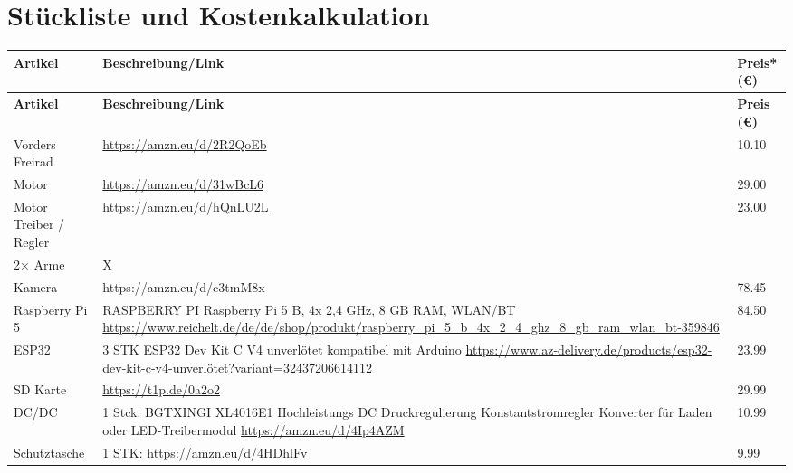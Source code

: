 \chapter{Stückliste und Kostenkalkulation}
\label{sec:Stückliste}
\begin{longtable}{|p{4cm}|p{7cm}|p{2.5cm}|}
	\hline
	\textbf{Artikel} & \textbf{Beschreibung/Link} & \textbf{Preis* (€)} \\
	\hline
	\endfirsthead
	
	\hline
	\textbf{Artikel} & \textbf{Beschreibung/Link} & \textbf{Preis (€)} \\
	\hline
	\endhead
	
	Vorders Freirad & \url{https://amzn.eu/d/2R2QoEb} & 10.10 \\
	\hline
	
	Motor & \url{https://amzn.eu/d/31wBcL6} & 29.00 \\
	\hline
	
	Motor Treiber / Regler & \url{https://amzn.eu/d/hQnLU2L} & 23.00 \\
	\hline
	
	2× Arme & X & \\
	\hline
	
	Kamera & https://amzn.eu/d/c3tmM8x & 78.45 \\
	\hline
	
	Raspberry Pi 5 & RASPBERRY PI Raspberry Pi 5 B, 4x 2,4 GHz, 8 GB RAM, WLAN/BT \newline \url{https://www.reichelt.de/de/de/shop/produkt/raspberry_pi_5_b_4x_2_4_ghz_8_gb_ram_wlan_bt-359846} & 84.50 \\
	\hline
	
	ESP32 & 3 STK \newline ESP32 Dev Kit C V4 unverlötet kompatibel mit Arduino \newline \url{https://www.az-delivery.de/products/esp32-dev-kit-c-v4-unverlötet?variant=32437206614112} & 23.99 \\
	\hline
	
	SD Karte & \url{https://t1p.de/0a2o2} & 29.99 \\
	\hline
	
	DC/DC & 1 Stck: BGTXINGI XL4016E1 Hochleistungs DC Druckregulierung Konstantstromregler Konverter für Laden oder LED-Treibermodul \newline \url{https://amzn.eu/d/4Ip4AZM} & 10.99 \\
	\hline
	
	Schutztasche & 1 STK: \url{https://amzn.eu/d/4HDhlFv} & 9.99 \\
	\hline
	

\end{longtable}
